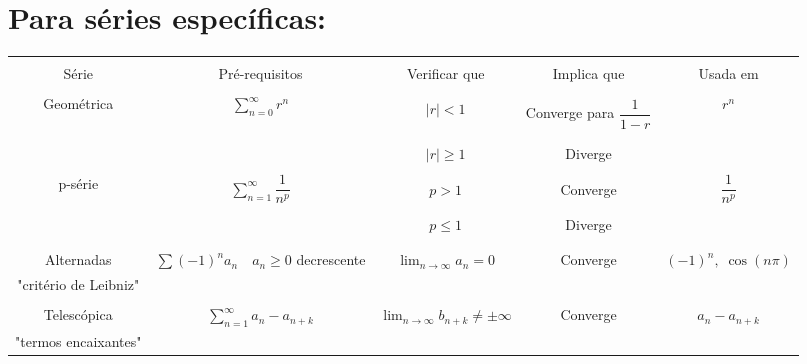 \documentclass[12pt]{article}
\begin{document}
\section{Para séries específicas:}

\begin{table}[h!]
	\centering
	\begin{tabular}{|c|c|c|c|c|c|}
		\hline
		&\multicolumn{2}{c|}{}&&&\\
		Série & \multicolumn{2}{c|}{Pré-requisitos} & Verificar que & Implica que & Usada em \\
		&\multicolumn{2}{c|}{}&&&\\
		\hline
		\multirow{6}{*}{Geométrica} & \multicolumn{2}{c|}{\multirow{6}{*}{$\displaystyle \sum_{n=0}^\infty r^n$}} &&& \multirow{6}{*}{$r^n$}\\
		&\multicolumn{2}{c|}{}& $|r| < 1$ & Converge para $\dfrac{1}{1-r}$ &\\
		&\multicolumn{2}{c|}{}&&&\\
		\cline{4-5}
		&\multicolumn{2}{c|}{}&&&\\
		&\multicolumn{2}{c|}{}& $|r| \geq 1$ & Diverge & \\
		&\multicolumn{2}{c|}{}&&&\\
		\hline
		\multirow{6}{*}{p-série} & \multicolumn{2}{c|}{\multirow{6}{*}{$\displaystyle \sum_{n=1}^\infty \dfrac{1}{n^p}$}} &&& \multirow{6}{*}{$\dfrac{1}{n^p}$}\\
		&\multicolumn{2}{c|}{}& $p > 1$ & Converge &\\
		&\multicolumn{2}{c|}{}&&&\\
		\cline{4-5}
		&\multicolumn{2}{c|}{}&&&\\
		&\multicolumn{2}{c|}{}& $p \leq 1$ & Diverge & \\
		&\multicolumn{2}{c|}{}&&&\\
		\hline
		&&&&&\\
		Alternadas & $\displaystyle \sum (-1)^na_n$ & $a_n \geq 0$ decrescente & $\displaystyle \lim_{n \rightarrow \infty} a_n = 0$ & Converge & $(-1)^n, \; \cos(n\pi)$\\
		\scriptsize"critério de Leibniz"&&&&& \\
		\hline
		&\multicolumn{2}{c|}{}&&&\\
		Telescópica & \multicolumn{2}{c|}{$\displaystyle \sum_{n=1}^{\infty} a_n - a_{n+k} $} & $\displaystyle \lim_{n \rightarrow \infty} b_{n+k} \neq \pm \infty$& Converge & $a_n - a_{n+k} $\\
		\scriptsize"termos encaixantes"&\multicolumn{2}{c|}{}&&&\\
		\hline
	\end{tabular}
\end{table}
\end{document}
